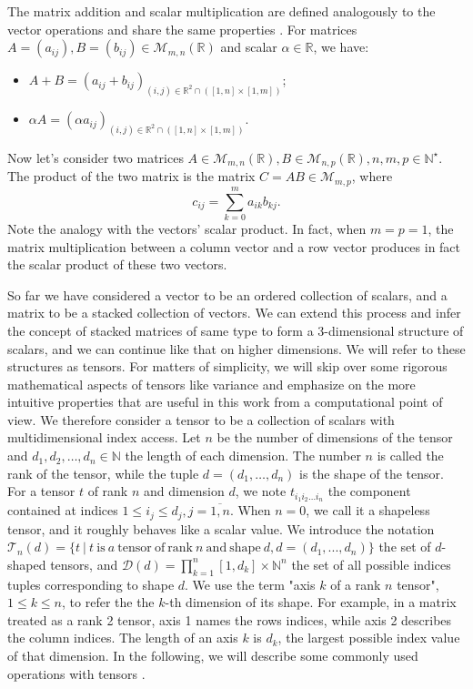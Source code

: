 \par The matrix addition and scalar multiplication are defined analogously to the vector operations and share the same properties \cite{LinAlSchaum}. For matrices $A=(a_{i j}),B=(b_{i j}) \in\mathcal{M}_{m,n}(\mathbb{R})$ and scalar $\alpha \in \mathbb{R}$, we have:
\begin{itemize}
\item $A+B = (a_{i j} + b_{i j})_{(i,j)\in\mathbb{R}^2 \cap ([1,n]\times[1,m])}$;
\item $\alpha A = (\alpha a_{i j})_{(i,j)\in\mathbb{R}^2 \cap ([1,n]\times[1,m])}$.
\end{itemize} 

\par Now let's consider two matrices $A \in\mathcal{M}_{m,n}(\mathbb{R}), B \in\mathcal{M}_{n,p}(\mathbb{R}), n,m,p \in \mathbb{N}^\star$. The product of the two matrix is the matrix $C = AB \in \mathcal{M}_{m,p}$, where
$$c_{i j} = \sum_{k=0}^{m} {a_{i k} b_{k j}}. $$
Note the analogy with the vectors' scalar product. In fact, when $m=p=1$, the matrix multiplication between a column vector and a row vector produces in fact the scalar product of these two vectors.

\par So far we have considered a vector to be an ordered collection of scalars, and a matrix to be a stacked collection of vectors. We can extend this process and infer the concept of stacked matrices of same type to form a 3-dimensional structure of scalars, and we can continue like that on higher dimensions. We will refer to these structures as tensors. For matters of simplicity, we will skip over some rigorous mathematical aspects of tensors \cite{TensorsPorat_2014} like variance and emphasize on the more intuitive properties that are useful in this work from a computational point of view. We therefore consider a tensor to be a collection of scalars with multidimensional index access. Let $n$ be the number of dimensions of the tensor and $d_1, d_2, \ldots, d_n \in \mathbb{N}$ the length of each dimension. The number $n$ is called the rank of the tensor, while the tuple $d=(d_1,\ldots,d_n)$ is the shape of the tensor. For a tensor $t$ of rank $n$ and dimension $d$, we note $t_{i_1 i_2 \ldots i_n}$ the component contained at indices $1 \leq i_j \leq d_j, j= \overline{1,n}$. When $n=0$, we call it a shapeless tensor, and it roughly behaves like a scalar value. We introduce the notation $\mathcal{T}_{n}(d)=\{t \ | \ t \ \mathrm{is} \ a \ \mathrm{tensor} \ \mathrm{of} \ \mathrm{rank} \ n \ \mathrm{and} \ \mathrm{shape} \ d, d=(d_1,...,d_n)\}$ the set of $d$-shaped tensors, and $\mathcal{D}(d)=\prod_{k=1}^{n}{[1,d_k]}\times \mathbb{N}^n$ the set of all possible indices tuples corresponding to shape $d$. We use the term "axis $k$ of a rank $n$ tensor", $1 \leq k \leq n$, to refer the the $k$-th dimension of its shape. For example, in a matrix treated as a rank 2 tensor, axis 1 names the rows indices, while axis 2 describes the column indices. The length of an axis $k$ is $d_k$, the largest possible index value of that dimension. In the following, we will describe some commonly used operations with tensors \cite{D2l}.

